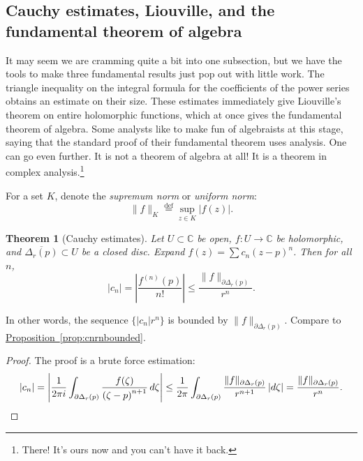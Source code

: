 \documentclass[12pt,openany]{book}
\newcommand{\sabs}[1]{\lvert {#1} \rvert}
\newcommand{\snorm}[1]{\lVert {#1} \rVert}
\newcommand{\abs}[1]{\left\lvert {#1} \right\rvert}
\newcommand{\C}{{\mathbb{C}}}
\newcommand{\myindex}[1]{#1\index{#1}}
\theoremstyle{plain}
\newtheorem{thm}{Theorem}[section]
\theoremstyle{remark}
\theoremstyle{definition}
\theoremstyle{exercise}
\theoremstyle{example}
\newcommand{\propref}[1]{\hyperref[#1]{Proposition~\ref*{#1}}}
\begin{document}
\subsection{Cauchy estimates, Liouville, and the fundamental theorem of
algebra}

It may seem we are cramming quite a bit into one subsection, but
we have the tools to make three fundamental results just pop out
with little work.  The triangle inequality on
the integral formula for the coefficients of the power series obtains an
estimate on their size.  These estimates immediately give
Liouville's theorem on entire holomorphic functions, which at once gives the
fundamental theorem of algebra.
Some analysts like to make fun of algebraists at this stage, saying that the
standard proof of their fundamental theorem uses analysis.
One can go even further.
It is not a theorem of algebra at all!
It is a theorem in
complex analysis.\footnote{There! It's ours now and you can't have it back.}

For a set $K$, denote the \emph{\myindex{supremum norm}} or
\emph{\myindex{uniform norm}}:
%
\begin{equation*}
\snorm{f}_K
\overset{\text{def}}{=}
\sup_{z \in K} \sabs{f(z)} .
\end{equation*}

\begin{thm}[Cauchy estimates]
Let $U \subset \C$ be open, $f \colon U \to \C$ be
holomorphic, and $\overline{\Delta_r(p)} \subset U$
be a closed disc.  Expand $f(z) = \sum c_n {(z-p)}^n$.
Then for all $n$,
\begin{equation*}
\sabs{c_n} =
\abs{\frac{f^{(n)}(p)}{n!}}
\leq
\frac{\snorm{f}_{\partial \Delta_r(p)}}{r^{n}} .
\end{equation*}
\end{thm}

In other words, the sequence $\bigl\{ \sabs{c_n} r^n \bigr\}$ is bounded by
$\snorm{f}_{\partial \Delta_r(p)}$.  Compare to \propref{prop:cnrnbounded}.

\begin{proof}
The proof is a brute force estimation:
\begin{equation*}
\sabs{c_n}  = 
\abs{
\frac{1}{2\pi i}
\int_{\partial \Delta_r(p)}
\frac{f(\zeta)}{{(\zeta-p)}^{n+1}}
\,
d \zeta 
}
\leq
\frac{1}{2\pi}
\int_{\partial \Delta_r(p)}
\frac{\snorm{f}_{\partial \Delta_r(p)}}{r^{n+1}}
\,
\sabs{d \zeta} 
=
\frac{\snorm{f}_{\partial \Delta_r(p)}}{r^{n}} .
\qedhere
\end{equation*}
\end{proof}
\end{document}
